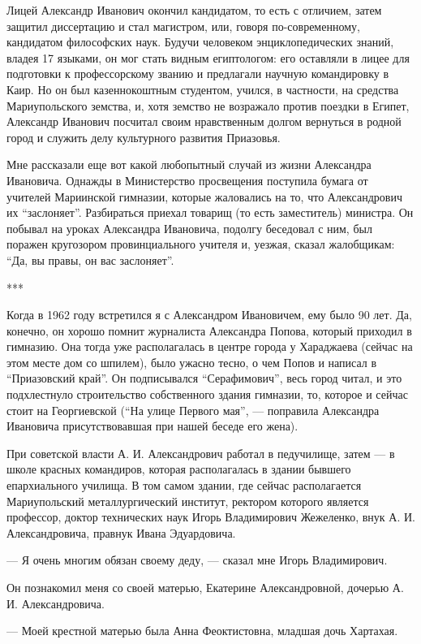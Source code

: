 Лицей Александр Иванович окончил кандидатом, то есть с отличием, затем защитил
диссертацию и стал магистром, или, говоря по-современному, кандидатом
философских наук. Будучи человеком энциклопедических знаний, владея 17 языками,
он мог стать видным египтологом: его оставляли в лицее для подготовки к
профессорскому званию и предлагали научную командировку в Каир. Но он был
казеннокоштным студентом, учился, в частности, на средства Мариупольского
земства, и, хотя земство не возражало против поездки в Египет, Александр
Иванович посчитал своим нравственным долгом вернуться в родной город и служить
делу культурного развития Приазовья.

Мне рассказали еще вот какой любопытный случай из жизни Александра Ивановича.
Однажды в Министерство просвещения поступила бумага от учителей Мариинской
гимназии, которые жаловались на то, что Александрович их \enquote{заслоняет}.
Разбираться приехал то­варищ (то есть заместитель) министра. Он побывал на
уроках Александра Ивановича, подолгу беседовал с ним, был поражен кругозором
провинциального учителя и, уезжая, сказал
жалобщикам: \enquote{Да, вы правы, он вас заслоняет}.

***

Когда в 1962 году встретился я с Александром Ивановичем, ему было 90 лет. Да,
конечно, он хорошо помнит журналиста Александра Попова, который приходил в
гимназию. Она тогда уже располагалась в центре города у Хараджаева (сейчас на
этом месте дом со шпилем), было ужасно тесно, о чем Попов и написал в
\enquote{Приазовский край}. Он подписывался \enquote{Серафимович}, весь город читал, и это
подхлестнуло строительство собственного здания гимназии, то, которое и сейчас
стоит на Георгиевской (\enquote{На улице Первого мая}, — поправила Александра Ивановича
присутствовавшая при нашей беседе его жена).

При советской власти А. И. Александрович работал в педучилище, затем — в школе
красных командиров, которая располагалась в здании бывшего епархиального
училища. В том самом здании, где сейчас располагается Мариупольский
металлургический институт, ректором которого является профессор, доктор
технических наук Игорь Владимирович Жежеленко, внук А. И. Александровича,
правнук Ивана Эдуардовича.

— Я очень многим обязан своему деду, — сказал мне Игорь Владимирович.

Он познакомил меня со своей матерью, Екатерине Александровной, дочерью А. И.
Александровича.

— Моей крестной матерью была Анна Феоктистовна, младшая дочь Хартахая.

